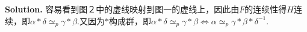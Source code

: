 \documentclass[a4paper]{book}
\newenvironment{solution}%
{\noindent\textbf{Solution.}}%
{\qedhere}
\numberwithin{equation}{chapter}
\theoremstyle{definition}
\begin{document}
\begin{multicols}{2}
\begin{solution}
	容易看到图２中的虚线映射到图一的虚线上，因此由$ F $的连续性得$ H $连续，即$ \alpha * \delta \simeq_p \gamma * \beta $.又因为$ * $构成群，即$ \alpha * \delta \simeq_p \gamma * \beta \Longleftrightarrow \alpha \simeq_p \gamma * \beta * \delta^{-1} $.　
\end{solution}
%

%

%


\end{multicols}
\end{document}
